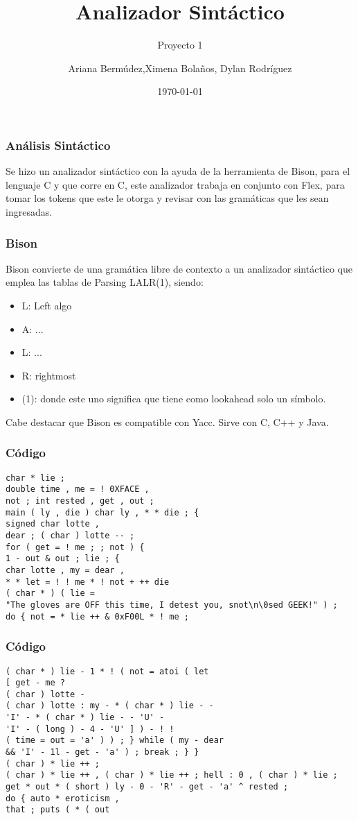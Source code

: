 \documentclass{beamer}
\title{Analizador Sint\'actico}
\subtitle{Proyecto 1}
\author{Ariana Berm\'udez,Ximena Bola\~nos, Dylan Rodr\'iguez}
\institute{Instituto Tecnol\'ogico de Costa Rica}
\date{\today}
\begin{document}
\begin{frame}
 \titlepage 
 \end{frame}\begin{frame}
 \frametitle{An\'alisis Sint\'actico}
  Se hizo un analizador sint\'actico con la ayuda de la herramienta de Bison, para el lenguaje C y que corre en C, este analizador trabaja en conjunto con Flex, para tomar los tokens que este le otorga y revisar con las gram\'aticas que les sean ingresadas. \end{frame}\begin{frame}
 \frametitle{Bison}
 Bison convierte de una gram\'atica libre de contexto a un analizador sint\'actico que emplea las tablas de Parsing LALR(1), siendo: \begin{itemize} \item L: Left algo \item A: ... \item L: ... \item R: rightmost \item (1): donde este uno significa que tiene como lookahead solo un s\'imbolo. \end{itemize} Cabe destacar que Bison es compatible con Yacc. Sirve con C, C++ y Java. \end{frame}\begin{frame}[fragile]
\frametitle{C\'odigo}
\begin{verbatim}
char * lie ; 
double time , me = ! 0XFACE , 
not ; int rested , get , out ; 
main ( ly , die ) char ly , * * die ; { 
signed char lotte , 
dear ; ( char ) lotte -- ; 
for ( get = ! me ; ; not ) { 
1 - out & out ; lie ; { 
char lotte , my = dear , 
* * let = ! ! me * ! not + ++ die 
( char * ) ( lie = 
"The gloves are OFF this time, I detest you, snot\n\0sed GEEK!" ) ; 
do { not = * lie ++ & 0xF00L * ! me ; 
\end{verbatim}
\end{frame}
\begin{frame}[fragile]
\frametitle{C\'odigo}
\begin{verbatim}
( char * ) lie - 1 * ! ( not = atoi ( let 
[ get - me ? 
( char ) lotte - 
( char ) lotte : my - * ( char * ) lie - - 
'I' - * ( char * ) lie - - 'U' - 
'I' - ( long ) - 4 - 'U' ] ) - ! ! 
( time = out = 'a' ) ) ; } while ( my - dear 
&& 'I' - 1l - get - 'a' ) ; break ; } } 
( char ) * lie ++ ; 
( char ) * lie ++ , ( char ) * lie ++ ; hell : 0 , ( char ) * lie ; 
get * out * ( short ) ly - 0 - 'R' - get - 'a' ^ rested ; 
do { auto * eroticism , 
that ; puts ( * ( out 
\end{verbatim}
\end{frame}
\end{document}
